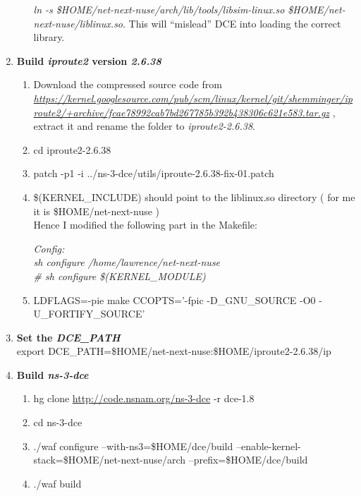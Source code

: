 \documentclass[a4paper,11pt]{article}
\begin{document}
\begin{enumerate}
\begin{enumerate}
					\emph{ln -s \$HOME/net-next-nuse/arch/lib/tools/libsim-linux.so \$HOME/net-next-nuse/liblinux.so}.
					This will ``mislead'' DCE into loading the correct library.

				\end{enumerate}

			\item \textbf{Build \emph{iproute2} version \emph{2.6.38}}

				\begin{enumerate}
					\sloppy
					\item Download the compressed source code from \\
					\nohyphens{\emph{\url{https://kernel.googlesource.com/pub/scm/linux/kernel/git/shemminger/iproute2/+archive/fcae78992cab7bd267785b392b438306c621e583.tar.gz}}} , extract it and rename the folder to \emph{iproute2-2.6.38}. 
					\item cd iproute2-2.6.38
					\item patch -p1 -i ../ns-3-dce/utils/iproute-2.6.38-fix-01.patch
					\item \$(KERNEL\_INCLUDE) should point to the liblinux.so directory ( for me it is \$HOME/net-next-nuse ) \\
					Hence I modified the following part in the Makefile:

					\emph{
					Config: \\
	                   \hspace*{2cm}sh configure /home/lawrence/net-next-nuse \\
	                   \hspace*{2cm}\# sh configure \$(KERNEL\_MODULE) }
	                \item \raggedright{LDFLAGS=-pie make CCOPTS='-fpic -D\_GNU\_SOURCE -O0 -U\_FORTIFY\_SOURCE'}

				\end{enumerate}

			\item \textbf{Set the \emph{DCE\_PATH}} \\
				export DCE\_PATH=\$HOME/net-next-nuse:\$HOME/iproute2-2.6.38/ip

			\item \textbf{Build \emph{ns-3-dce }}
				\begin{enumerate}
				
					\item hg clone \url{http://code.nsnam.org/ns-3-dce}  -r dce-1.8
					\item cd ns-3-dce
					\item ./waf configure --with-ns3=\$HOME/dce/build --enable-kernel-stack=\$HOME/net-next-nuse/arch --prefix=\$HOME/dce/build
					\item ./waf build
				\end{enumerate}


\end{enumerate}
\end{document}
